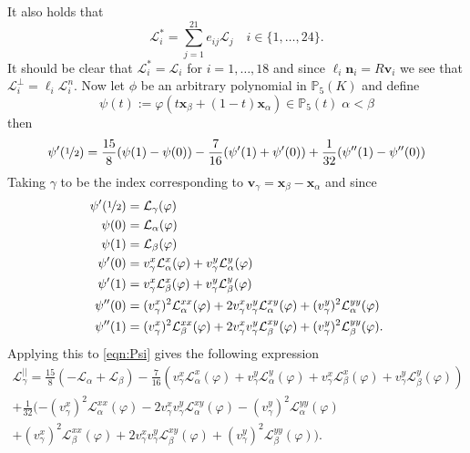 It also holds that
\begin{equation}
  \mathcal{L}^*_i = \sum_{j=1}^{21} e_{ij} \mathcal{L}_j \quad i\in
  \{1,\dots,24\}.
  \label{eqn:FunctionalsE}
\end{equation}
It should be clear that $\mathcal{L}^*_i = \mathcal{L}_i$ for $i=1,\dots,18$
and since $\ell_i \mathbf{n}_i = R \mathbf{v}_i$ we see that $\mathcal{L}^{\perp}_i =
\ell_i \mathcal{L}^n_i$. Now let $\phi$ be an arbitrary polynomial in
$\mathbb{P}_5(K)$ and define
\begin{equation*}
  \psi(t) := \varphi(t\mathbf{x}_{\beta} + (1-t)\mathbf{x}_{\alpha}) \in
  \mathbb{P}_5(t) \; \alpha<\beta
\end{equation*}
then
\begin{equation}
  \psi'(\nicefrac{1}{2}) = \frac{15}{8} (\psi(1)-\psi(0)) -
  \frac{7}{16} (\psi'(1)+\psi'(0)) + \frac{1}{32} (\psi''(1)-\psi''(0))
  \label{eqn:Psi}
\end{equation}
Taking $\gamma$ to be the index corresponding to $\mathbf{v}_{\gamma} =
\mathbf{x}_{\beta} - \mathbf{x}_{\alpha}$ and since
\begin{align*}
  \psi'(\nicefrac{1}{2}) &= \mathcal{L}_{\gamma}(\varphi) \\
  \psi(0) &= \mathcal{L}_{\alpha}(\varphi) \\
  \psi(1) &= \mathcal{L}_{\beta}(\varphi) \\
  \psi'(0) &= v^x_{\gamma}\mathcal{L}^x_{\alpha}(\varphi) +
    v^y_{\gamma}\mathcal{L}^y_{\alpha}(\varphi) \\
  \psi'(1) &= v^x_{\gamma}\mathcal{L}^x_{\beta}(\varphi) +
    v^y_{\gamma}\mathcal{L}^y_{\beta}(\varphi) \\
  \psi''(0) &= (v^x_{\gamma})^2\mathcal{L}^{xx}_{\alpha}(\varphi) +
    2 v^x_{\gamma}v^y_{\gamma}\mathcal{L}^{xy}_{\alpha}(\varphi) +
    (v^y_{\gamma})^2\mathcal{L}^{yy}_{\alpha}(\varphi) \\
  \psi''(1) &= (v^x_{\gamma})^2\mathcal{L}^{xx}_{\beta}(\varphi) +
    2 v^x_{\gamma}v^y_{\gamma}\mathcal{L}^{xy}_{\beta}(\varphi) +
    (v^y_{\gamma})^2\mathcal{L}^{yy}_{\beta}(\varphi).
\end{align*}
Applying this to \eqref{eqn:Psi} gives the following expression
\begin{equation*}
  \begin{split}
    \mathcal{L}^{||}_{\gamma} = \frac{15}{8}(-\mathcal{L}_{\alpha} +
      \mathcal{L}_{\beta})
    - \frac{7}{16} ( v^x_{\gamma}\mathcal{L}^x_{\alpha}(\varphi) +
      v^y_{\gamma}\mathcal{L}^y_{\alpha}(\varphi) +
      v^x_{\gamma}\mathcal{L}^x_{\beta}(\varphi) +
      v^y_{\gamma}\mathcal{L}^y_{\beta}(\varphi))
      \\
    + \frac{1}{32}(-(v^x_{\gamma})^2\mathcal{L}^{xx}_{\alpha}(\varphi) -
      2 v^x_{\gamma}v^y_{\gamma}\mathcal{L}^{xy}_{\alpha}(\varphi) -
      (v^y_{\gamma})^2\mathcal{L}^{yy}_{\alpha}(\varphi) \\
      + (v^x_{\gamma})^2\mathcal{L}^{xx}_{\beta}(\varphi) +
      2 v^x_{\gamma}v^y_{\gamma}\mathcal{L}^{xy}_{\beta}(\varphi) +
      (v^y_{\gamma})^2\mathcal{L}^{yy}_{\beta}(\varphi)).
  \end{split}
\end{equation*}
